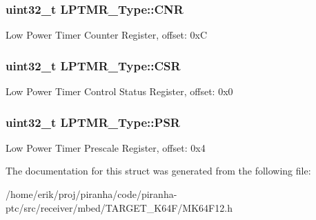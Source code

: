 \subsubsection[{\texorpdfstring{C\+NR}{CNR}}]{ uint32\+\_\+t L\+P\+T\+M\+R\+\_\+\+Type\+::\+C\+NR}\hypertarget{structLPTMR__Type_a9d7b37aa4696adb170d1834de319ff68}{}\label{structLPTMR__Type_a9d7b37aa4696adb170d1834de319ff68}
Low Power Timer Counter Register, offset\+: 0xC 
\subsubsection[{\texorpdfstring{C\+SR}{CSR}}]{ uint32\+\_\+t L\+P\+T\+M\+R\+\_\+\+Type\+::\+C\+SR}\hypertarget{structLPTMR__Type_a429aba6c7571f26fdc0c6315c0f920a7}{}\label{structLPTMR__Type_a429aba6c7571f26fdc0c6315c0f920a7}
Low Power Timer Control Status Register, offset\+: 0x0 
\subsubsection[{\texorpdfstring{P\+SR}{PSR}}]{ uint32\+\_\+t L\+P\+T\+M\+R\+\_\+\+Type\+::\+P\+SR}\hypertarget{structLPTMR__Type_a762750e61f8a71eae4ee81d9cc02fc51}{}\label{structLPTMR__Type_a762750e61f8a71eae4ee81d9cc02fc51}
Low Power Timer Prescale Register, offset\+: 0x4 

The documentation for this struct was generated from the following file\+:\begin{DoxyCompactItemize}
\item 
/home/erik/proj/piranha/code/piranha-\/ptc/src/receiver/mbed/\+T\+A\+R\+G\+E\+T\+\_\+\+K64\+F/M\+K64\+F12.\+h\end{DoxyCompactItemize}
